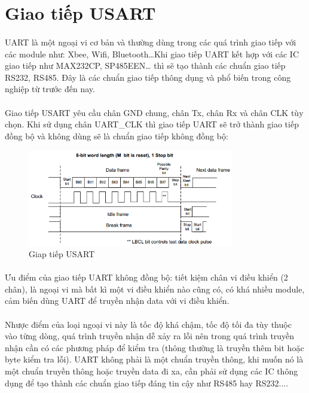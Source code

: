 \section{Giao tiếp USART}
\paragraph{}
UART là một ngoại vi cơ bản và thường dùng trong các quá trình giao tiếp với các module như: Xbee, Wifi, Bluetooth…Khi giao tiếp UART kết hợp với các IC giao tiếp như MAX232CP, SP485EEN… thì sẽ tạo thành các chuẩn giao tiếp RS232, RS485. Đây là các chuẩn giao tiếp thông dụng và phổ biến trong công nghiệp từ trước đến nay.
\paragraph{}
Giao tiếp USART yêu cầu chân GND chung, chân Tx, chân Rx và chân CLK tùy chọn. Khi sử dụng chân UART\_CLK thì giao tiếp UART sẽ trở thành giao tiếp đồng bộ và không dùng sẽ là chuẩn giao tiếp không đồng bộ:
\begin{figure}[H]
    \centering
    \includegraphics[width=0.8\textwidth]{images/uart-2.png}
    \caption{Giap tiếp USART}
    \label{fig:enter-label}
\end{figure}

\paragraph{}
Ưu điểm của giao tiếp UART không đồng bộ: tiết kiệm chân vi điều khiển (2 chân), là ngoại vi mà bất kì một vi điều khiển nào cũng có, có khá nhiều module, cảm biến dùng UART để truyền nhận data với vi điều khiển. 
\paragraph{}
Nhược điểm của loại ngoại vi này là tốc độ khá chậm, tốc độ tối đa tùy thuộc vào từng dòng, quá trình truyền nhận dễ xảy ra lỗi nên trong quá trình truyền nhận cần có các phương pháp để kiểm tra (thông thường là truyền thêm bit hoặc byte kiểm tra lỗi). UART không phải là một chuẩn truyền thông, khi muốn nó là một chuẩn truyền thông hoặc truyền data đi xa, cần phải sử dụng các IC thông dụng để tạo thành các chuẩn giao tiếp đáng tin cậy như RS485 hay RS232....
